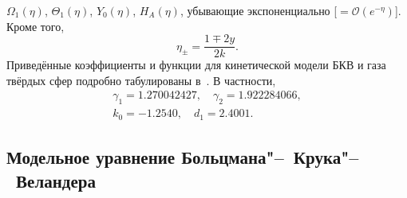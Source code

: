 \documentclass[a4paper,12pt]{article}
\begin{document}
\(\Omega_1(\eta)\), \(\Theta_1(\eta)\), \(Y_0(\eta)\), \(H_A(\eta)\),
убывающие экспоненциально [\(=\mathcal{O}(e^{-\eta})\)].
Кроме того,
\begin{equation}\label{eq:def_eta}
     \eta_\pm = \frac{1 \mp 2y}{2k}.
\end{equation}
Приведённые коэффициенты и функции для кинетической модели БКВ и газа твёрдых сфер
подробно табулированы в~\cite{Sone2007}. В частности,
\begin{gather}
    \gamma_1 = 1.270042427, \quad \gamma_2 = 1.922284066, \label{eq:gamma12_coefficients}\\
    k_0 = -1.2540, \quad d_1 = 2.4001. \label{eq:slip_coefficients}
\end{gather}


\subsection{Модельное уравнение Больцмана"--~Крука"--~Веландера}
\end{document}
